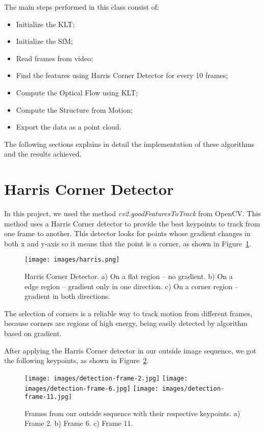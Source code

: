 \documentclass[]{IEEEtran}
\begin{document}
The main steps performed in this class consist of:

\begin{itemize}
  \item Initialize the KLT;
  \item Initialize the SfM;
  \item Read frames from video;
  \item Find the features using Harris Corner Detector for every 10 frames;
  \item Compute the Optical Flow using KLT;
  \item Compute the Structure from Motion;
  \item Export the data as a point cloud.
\end{itemize}

The following sections explains in detail the implementation of these algorithms and the results achieved.

\section{Harris Corner Detector}

In this project, we used the method \textit{cv2.goodFeaturesToTrack} from OpenCV. This method uses a Harris Corner detector to provide the best keypoints to track from one frame to another. This detector looks for points whose gradient changes in both x and y-axis so it means that the point is a corner, as shown in Figure~\ref{fig:harris}.

\begin{figure}[H]
    \centering
    \texttt{[image: images/harris.png]}
    \caption{Harris Corner Detector. a) On a flat region -- no gradient. b) On a edge region -- gradient only in one direction. c) On a corner region -- gradient in both directions.}
    \label{fig:harris}
\end{figure}

The selection of corners is a reliable way to track motion from different frames, because corners are regions of high energy, being easily detected by algorithm based on gradient.

After applying the Harris Corner detector in our outside image sequence, we got the following keypoints, as shown in Figure~\ref{fig:keypoints}.

\begin{figure}[H]
    \centering
    \texttt{[image: images/detection-frame-2.jpg]}
    \texttt{[image: images/detection-frame-6.jpg]}
    \texttt{[image: images/detection-frame-11.jpg]}
    \caption{Frames from our outside sequence with their respective keypoints. a) Frame 2. b) Frame 6. c) Frame 11.}
    \label{fig:keypoints}
\end{figure}
\end{document}
